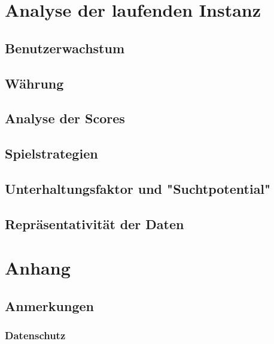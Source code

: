 \documentclass{scrreprt}
\begin{document}
\chapter{Analyse der laufenden Instanz}
\section{Benutzerwachstum}
\section{Währung}
\section{Analyse der Scores}
\section{Spielstrategien}
\section{Unterhaltungsfaktor und "Suchtpotential"}
\section{Repräsentativität der Daten}

\chapter{Anhang}
\section{Anmerkungen}
\subsection{Datenschutz}
\end{document}
